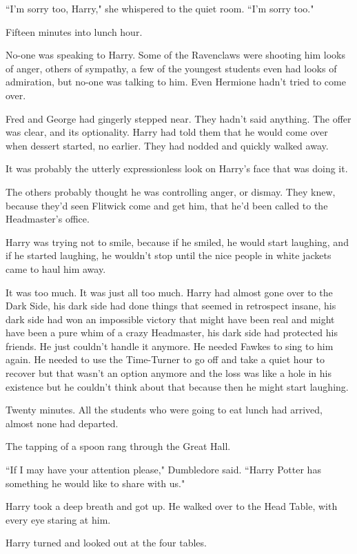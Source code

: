``I'm sorry too, Harry," she whispered to the quiet room. ``I'm sorry too."

\later

Fifteen minutes into lunch hour.

No-one was speaking to Harry. Some of the Ravenclaws were shooting him looks of anger, others of sympathy, a few of the youngest students even had looks of admiration, but no-one was talking to him. Even Hermione hadn't tried to come over.

Fred and George had gingerly stepped near. They hadn't said anything. The offer was clear, and its optionality. Harry had told them that he would come over when dessert started, no earlier. They had nodded and quickly walked away.

It was probably the utterly expressionless look on Harry's face that was doing it.

The others probably thought he was controlling anger, or dismay. They knew, because they'd seen Flitwick come and get him, that he'd been called to the Headmaster's office.

Harry was trying not to smile, because if he smiled, he would start laughing, and if he started laughing, he wouldn't stop until the nice people in white jackets came to haul him away.

It was too much. It was just all too much. Harry had almost gone over to the Dark Side, his dark side had done things that seemed in retrospect insane, his dark side had won an impossible victory that might have been real and might have been a pure whim of a crazy Headmaster, his dark side had protected his friends. He just couldn't handle it anymore. He needed Fawkes to sing to him again. He needed to use the Time-Turner to go off and take a quiet hour to recover but that wasn't an option anymore and the loss was like a hole in his existence but he couldn't think about that because then he might start laughing.

Twenty minutes. All the students who were going to eat lunch had arrived, almost none had departed.

The tapping of a spoon rang through the Great Hall.

``If I may have your attention please," Dumbledore said. ``Harry Potter has something he would like to share with us."

Harry took a deep breath and got up. He walked over to the Head Table, with every eye staring at him.

Harry turned and looked out at the four tables.

